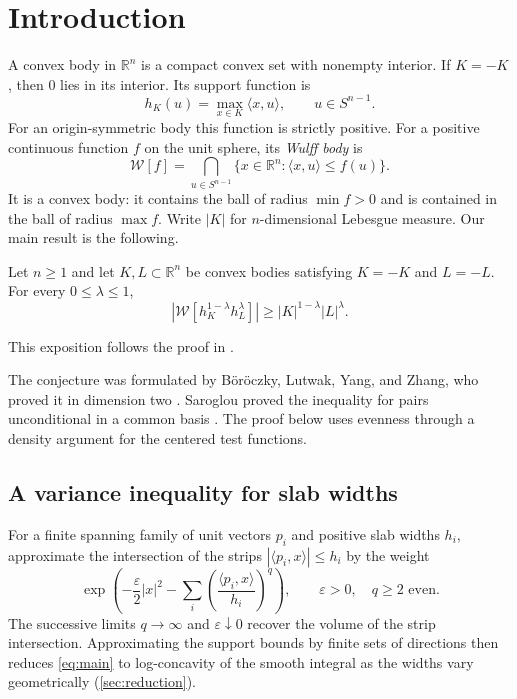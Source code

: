 \section{Introduction}
\label{sec:introduction}

A convex body in $\mathbb{R}^n$ is a compact convex set with nonempty interior. If $K=-K$, then $0$ lies in its interior. Its support function is
\[
 h_K(u)=\max_{x\in K}\langle x,u\rangle,\qquad u\in S^{n-1}.
\]
For an origin-symmetric body this function is strictly positive. For a positive continuous function $f$ on the unit sphere, its \emph{Wulff body} is
\[
 \mathcal{W}[f]=\bigcap_{u\in S^{n-1}}
 \{x\in\mathbb{R}^n:\langle x,u\rangle\le f(u)\}.
\]
It is a convex body: it contains the ball of radius $\min f>0$ and is contained in the ball of radius $\max f$. Write $|K|$ for $n$-dimensional Lebesgue measure. Our main result is the following.

\begin{maintheorem}
\label{thm:main}
Let $n\ge1$ and let $K,L\subset\mathbb{R}^n$ be convex bodies satisfying $K=-K$ and $L=-L$. For every $0\le\lambda\le1$,
\begin{equation}\label{eq:main}
 \left|\mathcal{W}[h_K^{1-\lambda}h_L^\lambda]\right|
 \ge |K|^{1-\lambda}|L|^\lambda.
\end{equation}
\end{maintheorem}

This exposition follows the proof in \cite{OpenAIMathSource}.

The conjecture was formulated by B\"or\"oczky, Lutwak, Yang, and Zhang, who proved it in dimension two \cite[Problem~1.1 and Theorem~1.3]{BLZY2012}. Saroglou proved the inequality for pairs unconditional in a common basis \cite[Theorem~1.2]{Saroglou2015}. The proof below uses evenness through a density argument for the centered test functions.

\subsection{A variance inequality for slab widths}

For a finite spanning family of unit vectors $p_i$ and positive slab widths $h_i$, approximate the intersection of the strips $|\langle p_i,x\rangle|\leq h_i$ by the weight
\[
 \exp\left(-\frac{\varepsilon}{2}|x|^2
       -\sum_i\left(\frac{\langle p_i,x\rangle}{h_i}\right)^q\right),
 \qquad \varepsilon>0,\quad q\geq2\text{ even}.
\]
The successive limits $q\to\infty$ and $\varepsilon\downarrow0$ recover the volume of the strip intersection. Approximating the support bounds by finite sets of directions then reduces \eqref{eq:main} to log-concavity of the smooth integral as the widths vary geometrically (\cref{sec:reduction}).

